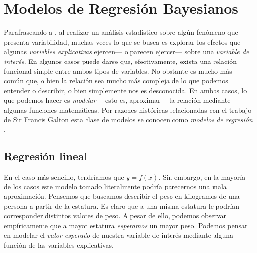 \chapter{Modelos de Regresión Bayesianos}

Parafraseando a \textcite{DraperSmith98}, al realizar un análisis estadístico sobre algún fenómeno que presenta variabilidad, muchas veces lo que se busca es explorar los efectos que algunas \textit{variables explicativas} ejercen--- o parecen ejercer--- sobre una \textit{variable de interés}. En algunos casos puede darse que, efectivamente, exista una relación funcional simple entre ambos tipos de variables. No obstante es mucho más común que, o bien la relación sea mucho más compleja de lo que podemos entender o describir, o bien simplemente nos es desconocida. En ambos casos, lo que podemos hacer es \textit{modelar}--- esto es, aproximar--- la relación mediante algunas funciones matemáticas. Por razones históricas relacionadas con el trabajo de Sir Francis Galton esta clase de modelos se conocen como \textit{modelos de regresión} \parencite{Zepeda15}. 

\section{Regresión lineal} 
 
En el caso más sencillo, tendríamos que $y=f(x)$. Sin embargo, en la mayoría de los casos este modelo tomado literalmente podría parecernos una mala aproximación. Pensemos que buscamos describir el peso en kilogramos de una persona a partir de la estatura. Es claro que a una misma estatura le podrían corresponder distintos valores de peso. A pesar de ello, podemos observar empíricamente que a mayor estatura \textit{esperamos} un mayor peso. Podemos pensar en modelar el \textit{valor esperado} de nuestra variable de interés mediante alguna función de las variables explicativas.\\

